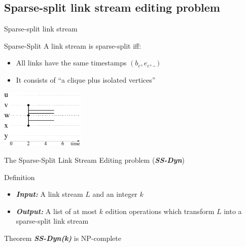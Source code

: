 \documentclass{beamer}
\begin{document}
\subsection{Sparse-split link stream editing problem}
\begin{frame}{Sparse-split link stream} 
  \begin{block}{Sparse-Split}
    A link stream is sparse-split iff:
    \begin{itemize}
    \item All links have the same timestamps $(b_c,e_c,\_ )$
    \item It consists of ``a clique plus isolated vertices''
    \end{itemize}
  \end{block}
  \begin{minipage}{1\linewidth}
    \centering
    \includegraphics[width=40mm]{sparse-split.pdf}
  \end{minipage}
\end{frame}
\begin{frame}{The Sparse-Split Link Stream Editing problem (\emph{\bfseries SS-Dyn})}
  \begin{block}{Definition}
    \begin{itemize}
    \item \emph{\bfseries Input:} A link stream $L$ and an integer $k$
    \item \emph{\bfseries Output:} A list of at most $k$ edition operations which transform $L$ into a sparse-split link stream
    \end{itemize}
  \end{block}
  \begin{block}{Theorem}
    \emph{\bfseries SS-Dyn(k)} is NP-complete
  \end{block}
\end{frame}
\end{document}
